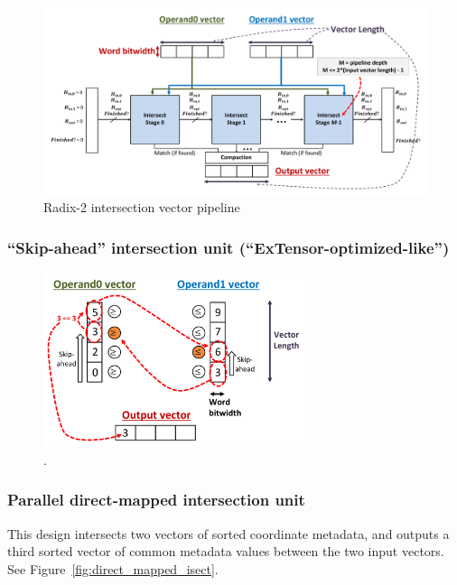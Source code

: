 \begin{figure}[H]
    \centering
    \includegraphics[width=\linewidth]{figures/two_finger_merge_pipeline.pdf}
    \caption{Radix-2 intersection vector pipeline}
    \label{fig:radix_2_vector pipeline}
\end{figure}

\subsubsection{``Skip-ahead'' intersection unit (``ExTensor-optimized-like'')}

\begin{figure}[ht]
\centering
\includegraphics[width=0.7\textwidth]{figures/skip_ahead_dia.pdf}
\caption{.}
\label{fig:skip_ahead_dia}
\end{figure}

\subsubsection{Parallel direct-mapped intersection unit}

This design intersects two vectors of sorted coordinate metadata, and outputs a third sorted vector of common metadata values between the two input vectors. See Figure~\ref{fig:direct_mapped_isect}.

